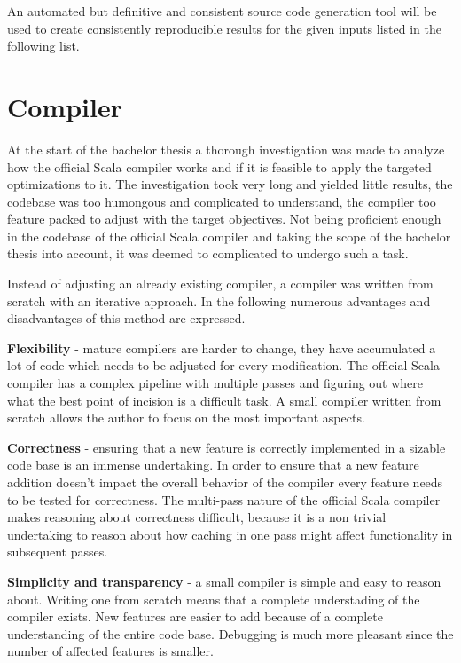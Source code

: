 \documentclass{VUMIFPSbakalaurinis}
\begin{document}
An automated but definitive and consistent source code generation tool will be used to create consistently reproducible results for the given inputs listed in the following list.

\section{Compiler}
At the start of the bachelor thesis a thorough investigation was made to analyze how the official Scala compiler works \cite{ScalaGithub} and if it is feasible to apply the targeted optimizations to it.
The investigation took very long and yielded little results, the codebase was too humongous and complicated to understand, the compiler too feature packed to adjust with the target objectives.
Not being proficient enough in the codebase of the official Scala compiler and taking the scope of the bachelor thesis into account, it was deemed to complicated to undergo such a task.

Instead of adjusting an already existing compiler, a compiler was written from scratch with an iterative approach.
In the following numerous advantages and disadvantages of this method are expressed.

\textbf{Flexibility} - mature compilers are harder to change, they have accumulated a lot of code which needs to be adjusted for every modification.
The official Scala compiler has a complex pipeline with multiple passes and figuring out where what the best point of incision is a difficult task.
A small compiler written from scratch allows the author to focus on the most important aspects.

\textbf{Correctness} - ensuring that a new feature is correctly implemented in a sizable code base is an immense undertaking.
In order to ensure that a new feature addition doesn't impact the overall behavior of the compiler every feature needs to be tested for correctness.
The multi-pass nature of the official Scala compiler makes reasoning about correctness difficult, because it is a non trivial undertaking to reason about how caching in one pass might affect functionality in subsequent passes.

\textbf{Simplicity and transparency} - a small compiler is simple and easy to reason about.
Writing one from scratch means that a complete understading of the compiler exists.
New features are easier to add because of a complete understanding of the entire code base.
Debugging is much more pleasant since the number of affected features is smaller.
\end{document}
